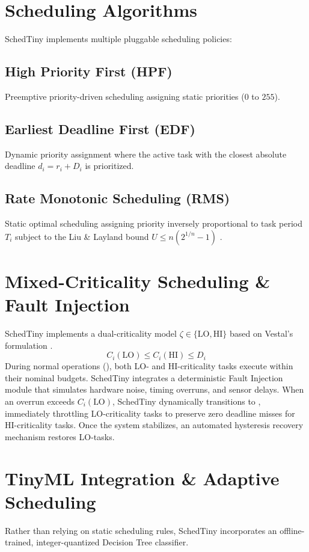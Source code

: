 \documentclass[conference]{IEEEtran}
\begin{document}
\section{Scheduling Algorithms}
SchedTiny implements multiple pluggable scheduling policies:
\subsection{High Priority First (HPF)}
Preemptive priority-driven scheduling assigning static priorities ($0$ to $255$).
\subsection{Earliest Deadline First (EDF)}
Dynamic priority assignment where the active task with the closest absolute deadline $d_i = r_i + D_i$ is prioritized.
\subsection{Rate Monotonic Scheduling (RMS)}
Static optimal scheduling assigning priority inversely proportional to task period $T_i$ subject to the Liu \& Layland bound $U \le n(2^{1/n}-1)$ \cite{liu1973scheduling}.

\section{Mixed-Criticality Scheduling \& Fault Injection}
SchedTiny implements a dual-criticality model $\zeta \in \{\text{LO}, \text{HI}\}$ based on Vestal's formulation \cite{vestal2007preemptive}. 
\begin{equation}
C_i(\text{LO}) \le C_i(\text{HI}) \le D_i
\end{equation}
During normal operations (), both LO- and HI-criticality tasks execute within their nominal budgets. SchedTiny integrates a deterministic Fault Injection module that simulates hardware noise, timing overruns, and sensor delays. When an overrun exceeds $C_i(\text{LO})$, SchedTiny dynamically transitions to , immediately throttling LO-criticality tasks to preserve zero deadline misses for HI-criticality tasks. Once the system stabilizes, an automated hysteresis recovery mechanism restores LO-tasks.



\section{TinyML Integration \& Adaptive Scheduling}
Rather than relying on static scheduling rules, SchedTiny incorporates an offline-trained, integer-quantized Decision Tree classifier. 
\end{document}
